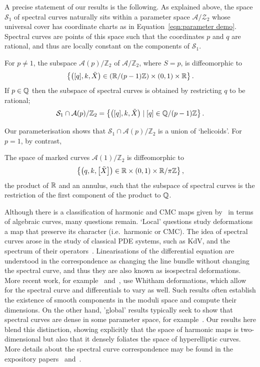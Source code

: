 \documentclass{article}
\begin{document}
A precise statement of our results is the following. As explained above, the space $\mathcal{S}_1$ of spectral curves naturally sits within a parameter space $\mathcal{A}/\mathcal{Z}_2$ whose universal cover has coordinate charts as in Equation~\eqref{eqn:parameter demo}. Spectral curves are points of this space such that the coordinates $p$ and $q$ are rational, and thus are locally constant on the components of $\mathcal{S}_1$.
\begin{thm}\label{thm:topology_curves}
For $p\neq 1$, the subspace $\mathcal{A}(p)/\mathbb{Z}_2$ of $\mathcal{A}/\mathbb{Z}_2$, where $S=p$, is diffeomorphic to
\[
\left\{ \left([q],k,\tilde{X}\right) \in \left(\mathbb{R}/ (p-1)\mathbb{Z}\right) \times (0,1) \times \mathbb{R} \right\}.
\]
If $p\in\mathbb{Q}$ then the subspace of spectral curves is obtained by restricting $q$ to be rational;
\[
\mathcal{S}_1 \cap \mathcal{A}(p)/\mathbb{Z}_2  = \left\{ \left([q],k,\tilde{X}\right) \mid [q] \in \mathbb{Q}/ (p-1)\mathbb{Z} \right\}.
\]
\end{thm}
Our parameterisation shows that $\mathcal{S}_1 \cap \mathcal{A}(p)/\mathbb{Z}_2$ is a union of `helicoids'. For $p=1$, by contrast,
\begin{thm}\label{thm:topology_curves_p1}
The space of marked curves $\mathcal{A}(1)/\mathbb{Z}_2$ is diffeomorphic to
\[
\left\{ \left(q,k,\left[\tilde{X}\right]\right) \in \mathbb{R} \times (0,1) \times \mathbb{R}/\pi\mathbb{Z} \right\},
\]
the product of $\mathbb{R}$ and an annulus, such that the subspace of spectral curves is the restriction of the first component of the product to $\mathbb{Q}$.
\end{thm}





Although there is a classification of harmonic and CMC maps given by~\cite{Hitchin1990,Pinkall1989,Bobenko1991} in terms of algebraic curves, many questions remain. 
`Local' questions study deformations a map that preserve its character (i.e.~harmonic or CMC). The idea of spectral curves arose in the study of classical PDE systems, such as KdV, and the spectrum of their operators~\cite{Flaschka1980,Krichever1995}. Linearisations of the differential equation are understood in the correspondence as changing the line bundle without changing the spectral curve, and thus they are also known as isospectral deformations. More recent work, for example~\cite{Kilian2010} and~\cite{Carberry2019}, use Whitham deformations, which allow for the spectral curve and differentials to vary as well. Such results often establish the existence of smooth components in the moduli space and compute their dimensions.
On the other hand, 'global' results typically seek to show that spectral curves are dense in some parameter space, for example~\cite{Carberry2016a,Carberry2016}.
Our results here blend this distinction, showing explicitly that the space of harmonic maps is two-dimensional but also that it densely foliates the space of hyperelliptic curves.
More details about the spectral curve correspondence may be found in the expository papers~\cite{McIntosh2008} and~\cite{Carberry2013a}.
\end{document}
